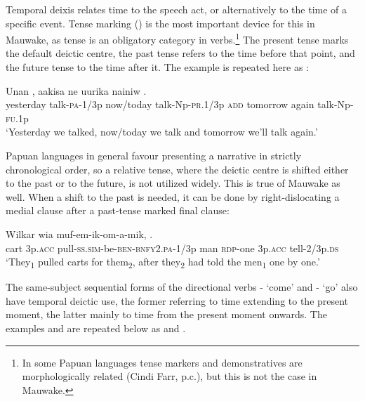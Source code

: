 Temporal deixis relates time to the speech act, or alternatively to the time of a specific event. Tense marking () is the most important device for this in Mauwake, as tense is an obligatory category in verbs.\footnote{In some Papuan languages tense markers and demonstratives are morphologically related (Cindi Farr, p.c.), but this is not the case in Mauwake.} The present tense marks the default deictic centre, the past tense refers to the time before that point, and the future tense to the time after it. The example  
is repeated here as :

\ea%
\label{ex:6:x1893}
\gll Unan  ,  aakisa    ne uurika  nainiw  .\\
yesterday  talk-\textsc{pa}-1/3p  now/today  talk-Np-\textsc{pr}.1/3p  \textsc{add} tomorrow  again  talk-Np-\textsc{fu}.1p\\
\glt `Yesterday we talked, now/today we talk and tomorrow we'll talk again.'
\z

Papuan languages in general favour presenting a narrative in strictly chronological order, so a relative tense, where the deictic centre is shifted either to the past or to the future, is not utilized widely. This is true of Mauwake as well. When a shift to the past is needed, it can be done by right-dislocating a medial clause after a past-tense marked final clause: 

\ea%
\label{ex:6:x1268}
\gll Wilkar  wia  muf-em-ik-om-a-mik,       .\\
cart  3p.\textsc{acc}  pull-\textsc{ss}.\textsc{sim}-be-\textsc{ben}-\textsc{bnfy}2.\textsc{pa}-1/3p  man \textsc{rdp}-one  3p.\textsc{acc}  tell-2/3p.\textsc{ds} \\
\glt `They\textsubscript{1} pulled carts for them\textsubscript{2}, after they\textsubscript{2} had told the men\textsubscript{1} one by one.'
\z

The same-subject sequential forms of the directional verbs - `come' and - `go' also have temporal deictic use, the former referring to time extending to the present moment, the latter mainly to time from the present moment onwards. The examples  and  
are repeated below as  and .

